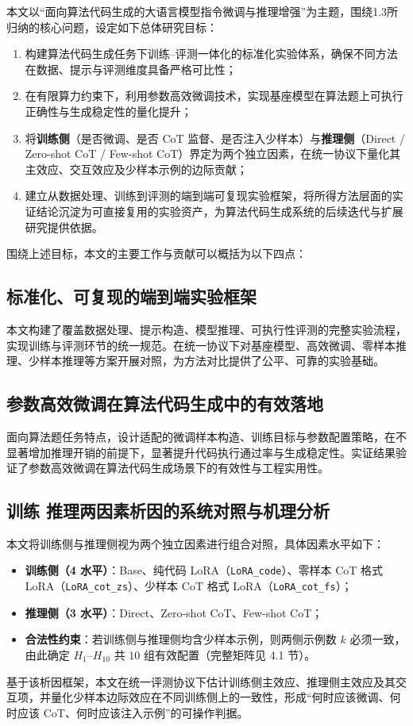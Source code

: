 
本文以“面向算法代码生成的大语言模型指令微调与推理增强”为主题，围绕1.3所归纳的核心问题，设定如下总体研究目标：

\begin{enumerate}
  \item 构建算法代码生成任务下训练–评测一体化的标准化实验体系，确保不同方法在数据、提示与评测维度具备严格可比性；
  \item 在有限算力约束下，利用参数高效微调技术，实现基座模型在算法题上可执行正确性与生成稳定性的量化提升；
  \item 将\textbf{训练侧}（是否微调、是否 CoT 监督、是否注入少样本）与\textbf{推理侧}（Direct / Zero-shot CoT / Few-shot CoT）界定为两个独立因素，在统一协议下量化其主效应、交互效应及少样本示例的边际贡献；
  \item 建立从数据处理、训练到评测的端到端可复现实验框架，将所得方法层面的实证结论沉淀为可直接复用的实验资产，为算法代码生成系统的后续迭代与扩展研究提供依据。
\end{enumerate}

围绕上述目标，本文的主要工作与贡献可以概括为以下四点：

\subsection{标准化、可复现的端到端实验框架}
本文构建了覆盖数据处理、提示构造、模型推理、可执行性评测的完整实验流程，实现训练与评测环节的统一规范。在统一协议下对基座模型、高效微调、零样本推理、少样本推理等方案开展对照，为方法对比提供了公平、可靠的实验基础。

\subsection{参数高效微调在算法代码生成中的有效落地}
面向算法题任务特点，设计适配的微调样本构造、训练目标与参数配置策略，在不显著增加推理开销的前提下，显著提升代码执行通过率与生成稳定性。实证结果验证了参数高效微调在算法代码生成场景下的有效性与工程实用性。

\subsection{训练 \texttimes{} 推理两因素析因的系统对照与机理分析}
本文将训练侧与推理侧视为两个独立因素进行组合对照，具体因素水平如下：
\begin{itemize}
    \item \textbf{训练侧（4 水平）}：Base、纯代码 LoRA（\texttt{LoRA\_code}）、零样本 CoT 格式 LoRA（\texttt{LoRA\_cot\_zs}）、少样本 CoT 格式 LoRA（\texttt{LoRA\_cot\_fs}）；
    \item \textbf{推理侧（3 水平）}：Direct、Zero-shot CoT、Few-shot CoT；
    \item \textbf{合法性约束}：若训练侧与推理侧均含少样本示例，则两侧示例数 $k$ 必须一致，由此确定 $H_1$--$H_{10}$ 共 $10$ 组有效配置（完整矩阵见 4.1 节）。
\end{itemize}
基于该析因框架，本文在统一评测协议下估计训练侧主效应、推理侧主效应及其交互项，并量化少样本边际效应在不同训练侧上的一致性，形成“何时应该微调、何时应该 CoT、何时应该注入示例”的可操作判据。

